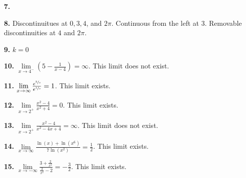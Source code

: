 \documentclass[12pt,]{book}
\theoremstyle{plain}
\theoremstyle{definition}
\numberwithin{equation}{section}
\newcommand{\fe}[2]{#1\mathopen{}\left(#2\right)\mathclose{}}
\begin{document}
            \par\smallskip
\noindent\textbf{7.}\quad{}
                {
}

            \par\smallskip
\noindent\textbf{8.}\quad{}
                Discontinuitues at \(0,3,4\), and \(2\pi\). Continuous from the left at \(3\). Removable discontinuities at \(4\) and \(2\pi\).%

            \par\smallskip
\noindent\textbf{9.}\quad{}
                \(k=0\)%

            \par\smallskip
\noindent\textbf{10.}\quad{}
                    \(\lim\limits_{x\to4^{-}}\left(5-\frac{1}{x-4}\right)=\infty\). This limit does not exist.%

                \par\smallskip
\noindent\textbf{11.}\quad{}
                    \(\lim\limits_{x\to\infty}\frac{e^{\sfrac{2}{x}}}{e^{\sfrac{1}{x}}}=1\). This limit exists.%

                \par\smallskip
\noindent\textbf{12.}\quad{}
                    \(\lim\limits_{x\to2^{+}}\frac{x^2-4}{x^2+4}=0\). This limit exists.%

                \par\smallskip
\noindent\textbf{13.}\quad{}
                    \(\lim\limits_{x\to2^{+}}\frac{x^2-4}{x^2-4x+4}=\infty\). This limit does not exist.%

                \par\smallskip
\noindent\textbf{14.}\quad{}
                    \(\lim\limits_{x\to\infty}\frac{\fe{\ln}{x}+\fe{\ln}{x^6}}{7\fe{\ln}{x^2}}=\frac{1}{2}\). This limit exists.%

                \par\smallskip
\noindent\textbf{15.}\quad{}
                    \(\lim\limits_{x\to-\infty}\frac{3+\frac{2}{x^2}}{\frac{3}{x^2}-2}=-\frac{3}{2}\). This limit exists.%
\end{document}
